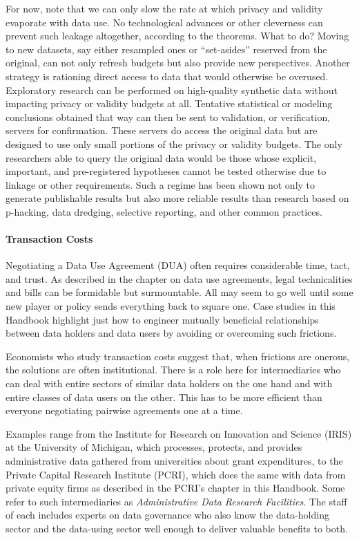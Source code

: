For now, note that we can only slow the rate at which privacy and
validity evaporate with data use. No technological advances or other
cleverness can prevent such leakage altogether, according to the
theorems. What to do? Moving to new datasets, say either resampled ones
or ``set-asides'' reserved from the original, can not only refresh
budgets but also provide new perspectives. Another strategy is rationing
direct access to data that would otherwise be overused. Exploratory
research can be performed on high-quality synthetic data without
impacting privacy or validity budgets at all. Tentative statistical or
modeling conclusions obtained that way can then be sent to validation,
or verification, servers for confirmation. These servers do access the
original data but are designed to use only small portions of the privacy
or validity budgets. The only researchers able to query the original
data would be those whose explicit, important, and pre-registered
hypotheses cannot be tested otherwise due to linkage or other
requirements. Such a regime has been shown not only to generate
publishable results but also more reliable results than research based
on p-hacking, data dredging, selective reporting, and other common
practices.

\paragraph{Transaction Costs}

Negotiating a Data Use Agreement (DUA) often requires considerable time,
tact, and trust. As described in the chapter on data use agreements,
legal technicalities and bills can be formidable but surmountable. All
may seem to go well until some new player or policy sends everything
back to square one. Case studies in this Handbook highlight just how to
engineer mutually beneficial relationships between data holders and data
users by avoiding or overcoming such frictions.

Economists who study transaction costs suggest that, when frictions are
onerous, the solutions are often institutional. There is a role here for
intermediaries who can deal with entire sectors of similar data holders
on the one hand and with entire classes of data users on the other. This
has to be more efficient than everyone negotiating pairwise agreements
one at a time.

Examples range from the Institute for Research on Innovation and Science
(IRIS) at the University of Michigan, which processes, protects, and
provides administrative data gathered from universities about grant
expenditures, to the Private Capital Research Institute (PCRI), which
does the same with data from private equity firms as described in the
PCRI's chapter in this Handbook. Some refer to such intermediaries as
\emph{Administrative Data Research Facilities}. The staff of each
includes experts on data governance who also know the data-holding
sector and the data-using sector well enough to deliver valuable
benefits to both.


